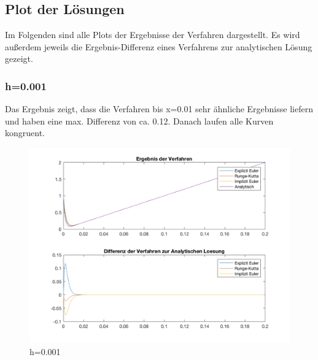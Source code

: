 \documentclass[]{scrartcl}
\begin{document}
\subsection{Plot der Lösungen}
Im Folgenden sind alle Plots der Ergebnisse der Verfahren dargestellt. Es wird außerdem jeweils die Ergebnis-Differenz eines Verfahrens zur analytischen Lösung gezeigt.
\subsubsection{h=0.001}
Das Ergebnis zeigt, dass die Verfahren bis x=0.01 sehr ähnliche Ergebnisse liefern und haben eine max. Differenz von ca. 0.12. Danach laufen alle Kurven kongruent.
\begin{figure}[H]
\centering
\includegraphics[width=1\linewidth]{a1_1_1}
\caption{h=0.001}
\label{fig:a1_1_1}
\end{figure}
\end{document}
